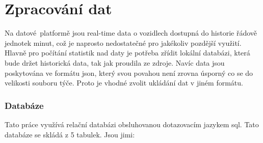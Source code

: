 
\chapter{Zpracování dat}

Na datové platformě jsou real-time data o vozidlech dostupná do historie řádově jednotek minut, což je naprosto nedostatečné pro jakékoliv pozdější využití. Hlavně pro počítání statistik nad daty je potřeba zřídit lokální databázi, která bude držet historická data, tak jak proudila ze zdroje. Navíc data jsou poskytována ve formátu \gls{json}, který svou povahou není zrovna úsporný co se do velikosti souboru týče. Proto je vhodné zvolit ukládání dat v jiném formátu.

\subsection{Databáze}

Tato práce využívá relační databázi obsluhovanou dotazovacím jazykem \gls{sql}. Tato databáze se skládá z 5 tabulek. Jsou jimi:

